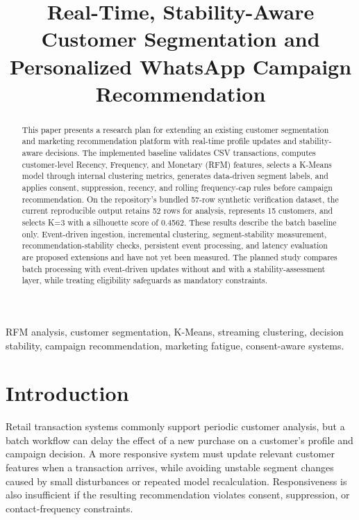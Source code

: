 \documentclass[conference]{IEEEtran}
\begin{document}
\title{Real-Time, Stability-Aware Customer Segmentation and Personalized WhatsApp Campaign Recommendation}

\author{
}

\maketitle

\begin{abstract}
This paper presents a research plan for extending an existing customer segmentation and marketing recommendation platform with real-time profile updates and stability-aware decisions. The implemented baseline validates CSV transactions, computes customer-level Recency, Frequency, and Monetary (RFM) features, selects a K-Means model through internal clustering metrics, generates data-driven segment labels, and applies consent, suppression, recency, and rolling frequency-cap rules before campaign recommendation. On the repository's bundled 57-row synthetic verification dataset, the current reproducible output retains 52 rows for analysis, represents 15 customers, and selects K=3 with a silhouette score of 0.4562. These results describe the batch baseline only. Event-driven ingestion, incremental clustering, segment-stability measurement, recommendation-stability checks, persistent event processing, and latency evaluation are proposed extensions and have not yet been measured. The planned study compares batch processing with event-driven updates without and with a stability-assessment layer, while treating eligibility safeguards as mandatory constraints.
\end{abstract}

\begin{IEEEkeywords}
RFM analysis, customer segmentation, K-Means, streaming clustering, decision stability, campaign recommendation, marketing fatigue, consent-aware systems.
\end{IEEEkeywords}

\section{Introduction}
Retail transaction systems commonly support periodic customer analysis, but a batch workflow can delay the effect of a new purchase on a customer's profile and campaign decision. A more responsive system must update relevant customer features when a transaction arrives, while avoiding unstable segment changes caused by small disturbances or repeated model recalculation. Responsiveness is also insufficient if the resulting recommendation violates consent, suppression, or contact-frequency constraints.
\end{document}
